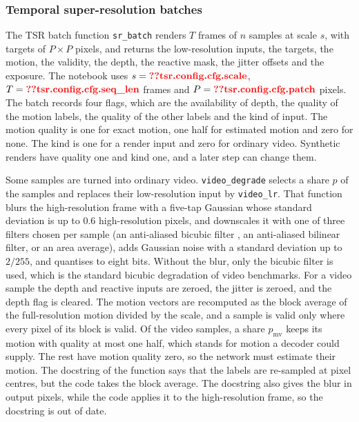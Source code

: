 \subsubsection{Temporal super-resolution batches}\label{sec:data-synth-tsr}

The TSR batch function \texttt{sr\_batch} renders $T$ frames of $n$ samples at scale $s$, with targets of $P\times P$ pixels, and returns the low-resolution inputs, the targets, the motion, the validity, the depth, the reactive mask, the jitter offsets and the exposure. The notebook uses $s=\Res{tsr.config.cfg.scale}$, $T=\Res{tsr.config.cfg.seq_len}$ frames and $P=\Res{tsr.config.cfg.patch}$ pixels. The batch records four flags, which are the availability of depth, the quality of the motion labels, the quality of the other labels and the kind of input. The motion quality is one for exact motion, one half for estimated motion and zero for none. The kind is one for a render input and zero for ordinary video. Synthetic renders have quality one and kind one, and a later step can change them.

Some samples are turned into ordinary video. \texttt{video\_degrade} selects a share $p$ of the samples and replaces their low-resolution input by \texttt{video\_lr}. That function blurs the high-resolution frame with a five-tap Gaussian whose standard deviation is up to 0.6 high-resolution pixels, and downscales it with one of three filters chosen per sample (an anti-aliased bicubic filter \cite{keys1981bicubic}, an anti-aliased bilinear filter, or an area average), adds Gaussian noise with a standard deviation up to $2/255$, and quantises to eight bits. Without the blur, only the bicubic filter is used, which is the standard bicubic degradation of video benchmarks. For a video sample the depth and reactive inputs are zeroed, the jitter is zeroed, and the depth flag is cleared. The motion vectors are recomputed as the block average of the full-resolution motion divided by the scale, and a sample is valid only where every pixel of its block is valid. Of the video samples, a share $p_{\mathrm{mv}}$ keeps its motion with quality at most one half, which stands for motion a decoder could supply. The rest have motion quality zero, so the network must estimate their motion. The docstring of the function says that the labels are re-sampled at pixel centres, but the code takes the block average. The docstring also gives the blur in output pixels, while the code applies it to the high-resolution frame, so the docstring is out of date.

